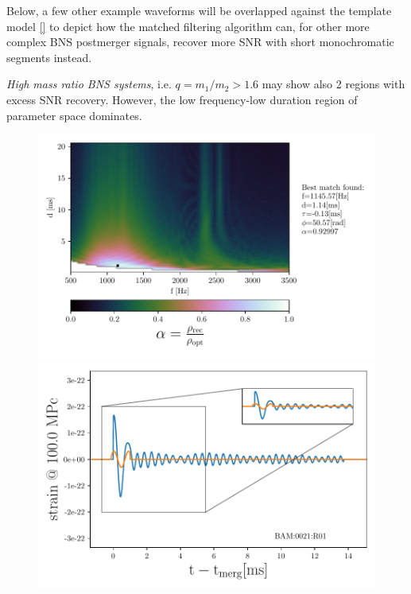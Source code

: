\FloatBarrier


Below, a few other example waveforms will be overlapped against the template model \ref{} to depict how the matched filtering algorithm can, for other more complex BNS postmerger signals, recover more SNR with short monochromatic segments instead.
 

\textit{High mass ratio BNS systems}, i.e. $q=m_1/m_2>1.6$ may show also 2 regions with excess SNR recovery. However, the low frequency-low duration region of parameter space dominates.

\begin{figure}[!htbp]
\begin{center}
\begin{minipage}[t]{0.5\linewidth}
\vspace{0pt}
\includegraphics[scale=0.6,trim={2mm 0 35mm 0},clip]{images/Data_analysis/results/2D_grid_3.pdf}
\end{minipage}%
\begin{minipage}[t]{0.5\linewidth}
\vspace{20pt}
\includegraphics[scale=0.45]{images/Data_analysis/results/2D_grid_4.pdf}

\end{minipage}
\end{center}
\end{figure}
